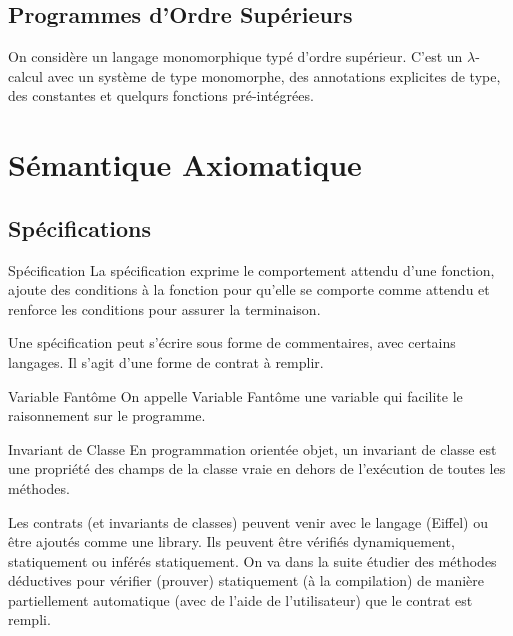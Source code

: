 \documentclass{cours}
\begin{document}
\subsection{Programmes d'Ordre Supérieurs}
On considère un langage monomorphique typé d'ordre supérieur. C'est un $\lambda$-calcul avec un système de type monomorphe, des annotations explicites de type, des constantes et quelqurs fonctions pré-intégrées.\\



\section{Sémantique Axiomatique}
\subsection{Spécifications}
\begin{définition}{Spécification}{}
La spécification exprime le comportement attendu d'une fonction, ajoute des conditions à la fonction pour qu'elle se comporte comme attendu et renforce les conditions pour assurer la terminaison. 
\end{définition}

Une spécification peut s'écrire sous forme de commentaires, avec certains langages. Il s'agit d'une forme de contrat à remplir. 

\begin{définition}{Variable Fantôme}{}
	On appelle Variable Fantôme une variable qui facilite le raisonnement sur le programme.
\end{définition}

\begin{définition}
	{Invariant de Classe}{}
	En programmation orientée objet, un invariant de classe est une propriété des champs de la classe vraie en dehors de l'exécution de toutes les méthodes.
\end{définition}

Les contrats (et invariants de classes) peuvent venir avec le langage (Eiffel) ou être ajoutés comme une library.
Ils peuvent être vérifiés dynamiquement, statiquement ou inférés statiquement. 
On va dans la suite étudier des méthodes déductives pour vérifier (prouver) statiquement (à la compilation) de manière partiellement automatique (avec de l'aide de l'utilisateur) que le contrat est rempli.  
\end{document}
